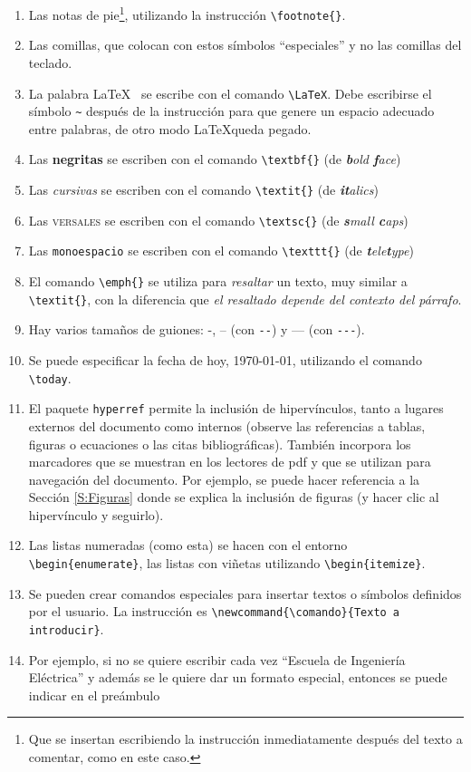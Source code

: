 \begin{enumerate}
\item Las notas de pie\footnote{Que se insertan escribiendo la instrucción inmediatamente después del texto a comentar, como en este caso.}, utilizando la instrucción \verb+\footnote{}+.
\item Las comillas, que colocan con estos símbolos ``especiales'' y no las comillas del teclado. 
\item La palabra \LaTeX~ se escribe con el comando \verb+\LaTeX+. Debe escribirse el símbolo \verb+~+ después de la instrucción para que genere un espacio adecuado entre palabras, de otro modo \LaTeX queda pegado.
\item Las \textbf{negritas} se escriben con el comando \verb+\textbf{}+ (de \textit{\textbf{b}old \textbf{f}ace})
\item Las \textit{cursivas} se escriben con el comando \verb+\textit{}+ (de \textit{\textbf{it}alics})
\item Las \textsc{versales} se escriben con el comando \verb+\textsc{}+ (de \textit{\textbf{s}mall \textbf{c}aps})
\item Las \texttt{monoespacio} se escriben con el comando \verb+\texttt{}+ (de \textit{\textbf{t}ele\textbf{t}ype})
\item El comando \verb+\emph{}+ se utiliza para \emph{resaltar} un texto, muy similar a \verb+\textit{}+, con la diferencia que \textit{el resaltado depende del \emph{contexto} del párrafo}.
\item Hay varios tamaños de guiones: -, -- (con \verb+--+) y --- (con \verb+---+).
\item Se puede especificar la fecha de hoy, \today, utilizando el comando \verb+\today+.
\item El paquete \verb+hyperref+ permite la inclusión de hipervínculos, tanto a lugares externos del documento como internos (observe las referencias a tablas, figuras o ecuaciones o las citas bibliográficas). También incorpora los   marcadores que se muestran en los lectores de pdf y que se utilizan para navegación del documento. Por ejemplo, se puede hacer referencia a la Sección \ref{S:Figuras} donde se explica la inclusión de figuras (y hacer clic al hipervínculo y seguirlo).
\item Las listas numeradas (como esta) se hacen con el entorno \verb+\begin{enumerate}+, las listas con viñetas utilizando \verb+\begin{itemize}+.
\item Se pueden crear comandos especiales para insertar textos o símbolos definidos por el usuario. La instrucción es \verb+\newcommand{\comando}{Texto a introducir}+.
\item Por ejemplo, si no se quiere escribir cada vez ``Escuela de Ingeniería Eléctrica'' y además se le quiere dar un formato especial, entonces se puede indicar en el preámbulo 


\end{enumerate}
